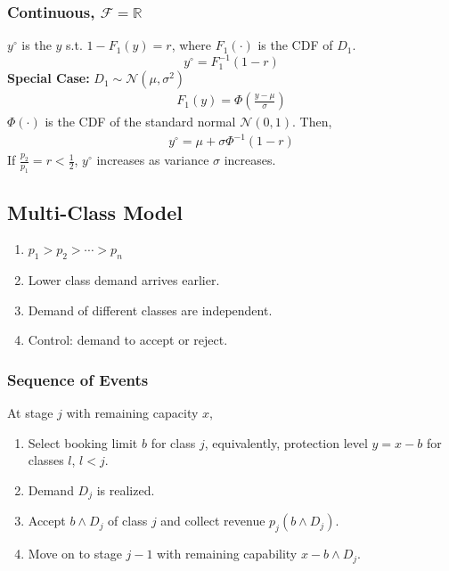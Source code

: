 \documentclass[11pt,a4paper]{article}
\begin{document}
\subsubsection{Continuous, $\mathcal{F}=\mathbb{R}$}
$y^\circ$ is the $y$ s.t. $1-F_1(y)=r$, where $F_1(\cdot)$ is the CDF of $D_1$.
$$y^\circ=F_1^{-1}(1-r)$$
\textbf{Special Case:} $D_1\sim \mathcal{N}(\mu,\sigma^2)$
\begin{equation}
    \begin{aligned}
        F_1(y)=\varPhi(\frac{y-\mu}{\sigma})
    \end{aligned}
    \nonumber
\end{equation}
$\varPhi(\cdot)$ is the CDF of the standard normal $\mathcal{N}(0,1)$. Then,
\begin{equation}
    \begin{aligned}
        y^\circ=\mu+\sigma\varPhi^{-1}(1-r)
    \end{aligned}
    \nonumber
\end{equation}
If $\frac{p_2}{p_1}=r<\frac{1}{2}$, $y^\circ$ increases as variance $\sigma$ increases.

\subsection{Multi-Class Model}
\begin{enumerate}[$\bullet$]
    \item $p_1>p_2>\cdots>p_n$
    \item Lower class demand arrives earlier.
    \item Demand of different classes are independent.
    \item Control: demand to accept or reject.
\end{enumerate}
\subsubsection{Sequence of Events}
At stage $j$ with remaining capacity $x$,
\begin{enumerate}
    \item Select booking limit $b$ for class $j$, equivalently, protection level $y=x-b$ for classes $l$, $l<j$.
    \item Demand $D_j$ is realized.
    \item Accept $b\wedge D_j$ of class $j$ and collect revenue $p_j(b\wedge D_j)$.
    \item Move on to stage $j-1$ with remaining capability $x-b\wedge D_j$.
\end{enumerate}
\end{document}
